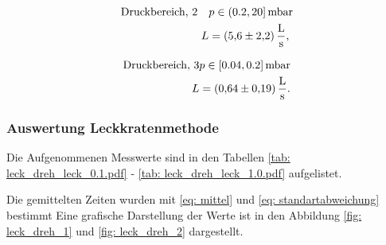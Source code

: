 \begin{align}
  \label{eq:dreh_leit_2}
  \begin{aligned}
  \text{Druckbereich, 2} \quad  &p\in(0.2,20]\,\si{\milli\bar} \\
   L&=\SI{5.6\pm 2.2}{\litre\per\second},
\end{aligned}
\end{align}

\begin{align}
  \label{eq:dreh_leit_3}
  \begin{aligned}
  \text{Druckbereich, 3} &p\in[0.04,0.2]\,\si{\milli\bar} \\
   L&=\SI{0.64\pm 0.19}{\litre\per\second}.
\end{aligned}
\end{align}

\subsubsection{Auswertung Leckkratenmethode}

Die Aufgenommenen Messwerte sind in den Tabellen \ref{tab: leck_dreh_leck_0.1.pdf} - \ref{tab: leck_dreh_leck_1.0.pdf} aufgelistet.





Die gemittelten Zeiten wurden mit \eqref{eq: mittel} und \eqref{eq: standartabweichung} bestimmt
Eine grafische Darstellung der Werte ist in den Abbildung \ref{fig: leck_dreh_1} und \ref{fig: leck_dreh_2} dargestellt.

